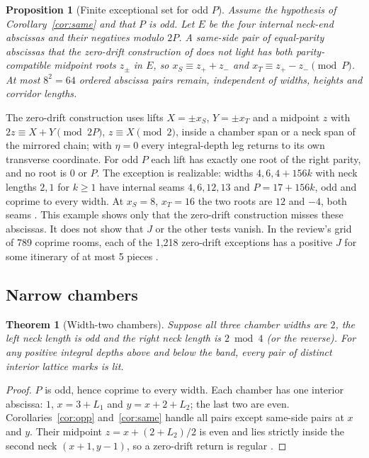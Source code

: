 \documentclass[11pt]{article}
\newtheorem{theorem}{Theorem}
\newtheorem{proposition}{Proposition}
\theoremstyle{definition}
\theoremstyle{remark}
\begin{document}
\begin{proposition}[Finite exceptional set for odd $P$]\label{prop:exc}
Assume the hypothesis of Corollary~\ref{cor:same} and that $P$ is odd. Let $E$ be
the four internal neck-end abscissas and their negatives modulo $2P$. A
same-side pair of equal-parity abscissas that the zero-drift construction of
\cite{R5} does not light has both parity-compatible midpoint roots $z_\pm$ in $E$,
so $x_S\equiv z_++z_-$ and $x_T\equiv z_+-z_-\pmod P$. At most $8^2=64$ ordered
abscissa pairs remain, independent of widths, heights and corridor lengths.
\end{proposition}

The zero-drift construction uses lifts $X=\pm x_S$, $Y=\pm x_T$ and a midpoint
$z$ with $2z\equiv X+Y\pmod{2P}$, $z\equiv X\pmod 2$, inside a chamber span or a
neck span of the mirrored chain; with $\eta=0$ every integral-depth leg returns to
its own transverse coordinate. For odd $P$ each lift has exactly one root of the
right parity, and no root is $0$ or $P$. The exception is realizable: widths
$4,6,4+156k$ with neck lengths $2,1$ for $k\ge 1$ have internal seams
$4,6,12,13$ and $P=17+156k$, odd and coprime to every width. At $x_S=8$, $x_T=16$
the two roots are $12$ and $-4$, both seams \cite{R5}. This example shows only
that the zero-drift construction misses these abscissas. It does not show that
$J$ or the other tests vanish. In the review's grid of 789 coprime rooms, each of
the 1,218 zero-drift exceptions has a positive $J$ for some itinerary of at most
5 pieces \cite{d203}.

\subsection{Narrow chambers}
\begin{theorem}[Width-two chambers]\label{thm:w2}
Suppose all three chamber widths are $2$, the left neck length is odd and the
right neck length is $2\bmod 4$ (or the reverse). For any positive integral
depths above and below the band, every pair of distinct interior lattice marks is
lit.
\end{theorem}

\begin{proof}
$P$ is odd, hence coprime to every width. Each chamber has one interior abscissa:
$1$, $x=3+L_1$ and $y=x+2+L_2$; the last two are even. Corollaries~\ref{cor:opp}
and~\ref{cor:same} handle all pairs except same-side pairs at $x$ and $y$. Their
midpoint $z=x+(2+L_2)/2$ is even and lies strictly inside the second neck
$(x+1,y-1)$, so a zero-drift return is regular \cite{R5,d203}.
\end{proof}
\end{document}

